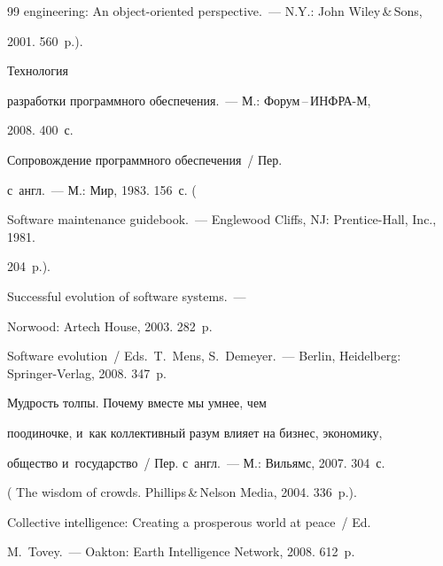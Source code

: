 {{\begin{thebibliography}{99}
engineering: An object-oriented perspective.~--- N.Y.: John Wiley\,\&\,Sons,

2001. 560~p.).


 Технология

разработки про\-грам\-мно\-го обеспечения.~--- М.: Форум\,--\,ИНФРА-М,

2008. 400~с.


 Сопровождение программного обеспечения~/ Пер.

с~англ.~--- М.: Мир, 1983. 156~с. (

Software maintenance guidebook.~--- Englewood Cliffs, NJ: Prentice-Hall, Inc., 1981.

204~p.).


 Successful evolution of software systems.~---

Norwood: Artech House, 2003. 282~p.


Software evolution~/ Eds.\ T.~Mens, S.~Demeyer.~--- Berlin, Heidelberg: Springer-Verlag, 2008. 347~p.




 Мудрость толпы. Почему вместе мы умнее, чем

поодиночке, и~как коллективный разум влияет на бизнес, экономику,

общество и~государство~/ Пер. с~англ.~--- М.: Вильямс, 2007. 304~с.

( The wisdom of crowds. Phillips\,\&\,Nelson Media, 2004. 336~p.).




Collective intelligence: Creating a prosperous world at peace~/ Ed.\

M.~Tovey.~--- Oakton: Earth Intelligence Network, 2008. 612~p.

\end{thebibliography}

} }





\vspace*{-6pt}



